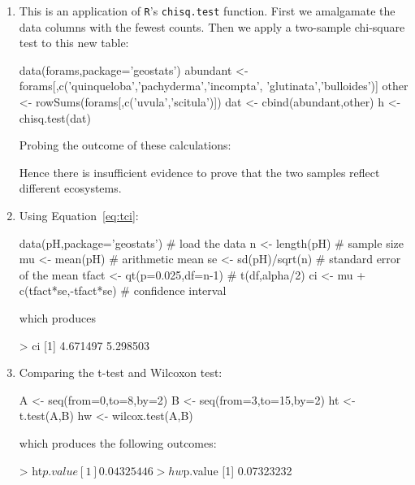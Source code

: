 \begin{enumerate}

\item This is an application of \texttt{R}'s \texttt{chisq.test}
  function. First we amalgamate the data columns with the fewest
  counts. Then we apply a two-sample chi-square test to this new
  table:

\begin{script}
data(forams,package='geostats')
abundant <- forams[,c('quinqueloba','pachyderma','incompta',
                      'glutinata','bulloides')]
other <- rowSums(forams[,c('uvula','scitula')])
dat <- cbind(abundant,other)
h <- chisq.test(dat)
\end{script}

Probing the outcome of these calculations:


Hence there is insufficient evidence to prove that the two samples
reflect different ecosystems.

\item Using Equation~\ref{eq:tci}:

\begin{script}
data(pH,package='geostats')      # load the data
n <- length(pH)                  # sample size
mu <- mean(pH)                   # arithmetic mean
se <- sd(pH)/sqrt(n)             # standard error of the mean 
tfact <- qt(p=0.025,df=n-1)      # t(df,alpha/2)
ci <- mu + c(tfact*se,-tfact*se) # confidence interval
\end{script}

\noindent which produces

\begin{console}
> ci
[1] 4.671497 5.298503
\end{console}

\item Comparing the t-test and Wilcoxon test:

\begin{script}
A <- seq(from=0,to=8,by=2)
B <- seq(from=3,to=15,by=2)
ht <- t.test(A,B)
hw <- wilcox.test(A,B)
\end{script}

\noindent which produces the following outcomes:

\begin{console}
> ht$p.value
[1] 0.04325446
> hw$p.value
[1] 0.07323232
\end{console}


\end{enumerate}

